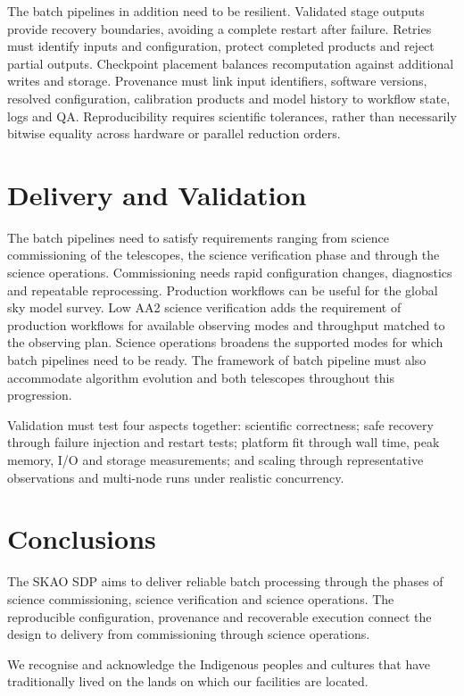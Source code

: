 \documentclass[11pt,twoside]{article}
\begin{document}
The batch pipelines in addition need to be resilient.
Validated stage outputs provide recovery boundaries, avoiding a complete
restart after failure. Retries must identify inputs and configuration,
protect completed products and reject partial outputs. Checkpoint placement
balances recomputation against additional writes and storage. Provenance
must link input identifiers, software versions, resolved configuration,
calibration products and model history to workflow state, logs and QA.
Reproducibility requires scientific tolerances, rather than necessarily
bitwise equality across hardware or parallel reduction orders.

\section{Delivery and Validation}
The batch pipelines need to satisfy requirements ranging from science commissioning of the telescopes, the science verification phase and through the science operations.
Commissioning needs rapid configuration changes, diagnostics and repeatable
reprocessing. Production workflows can be useful for the global sky model survey. Low AA2 science verification adds the requirement of production workflows for available observing modes and throughput matched to the observing plan. Science operations broadens the supported modes for which batch pipelines need to be ready. The framework of batch pipeline  must also accommodate algorithm evolution and both telescopes throughout this progression.

Validation must test four aspects together: scientific correctness; safe
recovery through failure injection and restart tests; platform fit through
wall time, peak memory, I/O and storage measurements; and scaling through
representative observations and multi-node runs under realistic concurrency.


\section{Conclusions}
The SKAO SDP aims to deliver reliable batch processing through the phases of science commissioning, science verification and science operations. The reproducible configuration, provenance and recoverable execution connect the design to delivery from commissioning through science operations.



%



\acknowledgements We recognise and acknowledge the Indigenous peoples and cultures that have traditionally lived on the lands on which our facilities are located. 



\end{document}
